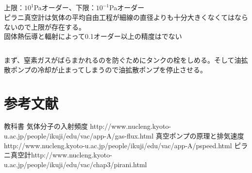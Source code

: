\documentclass{jsarticle}
\begin{document}
\subsection{}
上限：$10^1$Paオーダー、下限：$10^{-1}$Paオーダー\\
ピラニ真空計は気体の平均自由工程が細線の直径よりも十分大きくなくてはならないので上限が存在する。\\
固体熱伝導と輻射によって0.1オーダー以上の精度はでない\\
\subsection{}
まず、窒素ガスがばらまかれるのを防ぐためにタンクの栓をしめる。そして油拡散ポンプの冷却が止まってしまうので油拡散ポンプを停止させる。
\section{参考文献}
\begin{thebibliography}{99}
\bibitem{} 教科書
\bibitem{} 気体分子の入射頻度 http://www.nucleng.kyoto-u.ac.jp/people/ikuji/edu/vac/app-A/gas-flux.html
\bibitem{} 真空ポンプの原理と排気速度 http://www.nucleng.kyoto-u.ac.jp/people/ikuji/edu/vac/app-A/pspeed.html
\bibitem{} ピラニ真空計http://www.nucleng.kyoto-u.ac.jp/people/ikuji/edu/vac/chap3/pirani.html
\end{thebibliography} 
\end{document}
